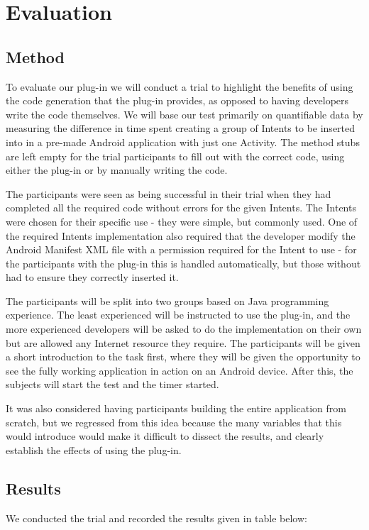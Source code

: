 \section{Evaluation}
\subsection{Method}
To evaluate our plug-in we will conduct a trial to highlight the benefits of using the code generation that the plug-in provides, as opposed to having developers write the code themselves. We will base our test primarily on quantifiable data by measuring the difference in time spent creating a group of Intents to be inserted into in a pre-made Android application with just one Activity. The method stubs are left empty for the trial participants to fill out with the correct code, using either the plug-in or by manually writing the code.

The participants were seen as being successful in their trial when they had completed all the required code without errors for the given Intents. The Intents were chosen for their specific use - they were simple, but commonly used. One of the required Intents implementation also required that the developer modify the Android Manifest XML file with a permission required for the Intent to use - for the participants with the plug-in this is handled automatically, but those without had to ensure they correctly inserted it.

The participants will be split into two groups based on Java programming experience. The least experienced will be instructed to use the plug-in, and the more experienced developers will be asked to do the implementation on their own but are allowed any Internet resource they require. The participants will be given a short introduction to the task first, where they will be given the opportunity to see the fully working application in action on an Android device. After this, the subjects will start the test and the timer started.

It was also considered having participants building the entire application from scratch, but we regressed from this idea because the many variables that this would introduce would make it difficult to dissect the results, and clearly establish the effects of using the plug-in.

\subsection{Results}
We conducted the trial and recorded the results given in table below:

